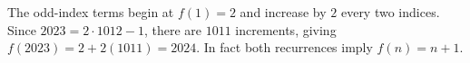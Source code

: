 The odd-index terms begin at $f(1)=2$ and increase by $2$ every two indices. Since $2023=2\cdot1012-1$, there are $1011$ increments, giving $f(2023)=2+2(1011)=\boxed{2024}$. In fact both recurrences imply $f(n)=n+1$.
